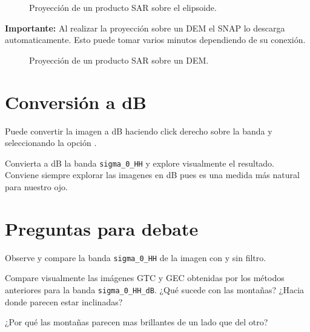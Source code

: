  \begin{figure}[h!]
      \centering
      \hspace{1cm}
      \caption{Proyección de un producto SAR sobre el elipsoide.}
      \label{fig:elipsoide}
  \end{figure}

{\bf Importante:} Al realizar la proyección sobre un DEM el SNAP lo descarga automaticamente. Esto puede tomar varios minutos dependiendo de su conexión.

\begin{figure}[h!]
    \centering
    \hspace{1cm}
    \caption{Proyección de un producto SAR sobre un DEM.}
    \label{fig:gtc}
\end{figure}

\section{Conversión a dB}

Puede convertir la imagen a dB haciendo click derecho sobre la banda y seleccionando la opción .

Convierta a dB la banda \texttt{sigma\_0\_HH} y explore visualmente el resultado. Conviene siempre explorar las imagenes en dB pues es una medida más natural para nuestro ojo.

\section{Preguntas para debate}

\begin{que}
    Observe y compare la banda \texttt{sigma\_0\_HH} de la imagen con y sin filtro.
\end{que}

\begin{que}
    Compare visualmente las imágenes GTC y GEC obtenidas por los métodos anteriores para la banda \texttt{sigma\_0\_HH\_dB}. ¿Qué sucede con las montañas? ¿Hacia donde parecen estar inclinadas?
\end{que}

\begin{que}
    ¿Por qué las montañas parecen mas brillantes de un lado que del otro?
\end{que}

